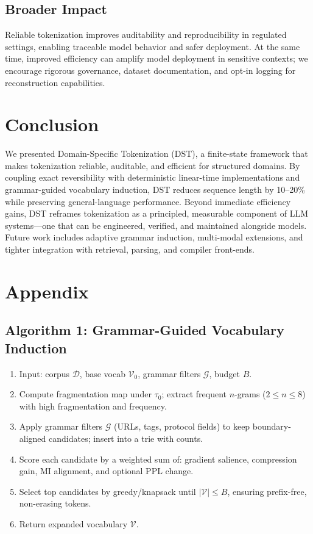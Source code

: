 \subsection{Broader Impact}

Reliable tokenization improves auditability and reproducibility in regulated settings, enabling traceable model behavior and safer deployment.
At the same time, improved efficiency can amplify model deployment in sensitive contexts; we encourage rigorous governance, dataset documentation, and opt-in logging for reconstruction capabilities.

\section{Conclusion}

We presented Domain-Specific Tokenization (DST), a finite-state framework that makes tokenization reliable, auditable, and efficient for structured domains.
By coupling exact reversibility with deterministic linear-time implementations and grammar-guided vocabulary induction, DST reduces sequence length by 10–20\% while preserving general-language performance.
Beyond immediate efficiency gains, DST reframes tokenization as a principled, measurable component of LLM systems—one that can be engineered, verified, and maintained alongside models.
Future work includes adaptive grammar induction, multi-modal extensions, and tighter integration with retrieval, parsing, and compiler front-ends.

\appendix
\section{Appendix}

\subsection{Algorithm 1: Grammar-Guided Vocabulary Induction}
\begin{enumerate}
  \item Input: corpus $\mathcal{D}$, base vocab $\mathcal{V}_0$, grammar filters $\mathcal{G}$, budget $B$.
  \item Compute fragmentation map under $\tau_0$; extract frequent $n$-grams ($2\!\le\!n\!\le\!8$) with high fragmentation and frequency.
  \item Apply grammar filters $\mathcal{G}$ (URLs, tags, protocol fields) to keep boundary-aligned candidates; insert into a trie with counts.
  \item Score each candidate by a weighted sum of: gradient salience, compression gain, MI alignment, and optional PPL change.
  \item Select top candidates by greedy/knapsack until $|\mathcal{V}|\le B$, ensuring prefix-free, non-erasing tokens.
  \item Return expanded vocabulary $\mathcal{V}$.
\end{enumerate}

